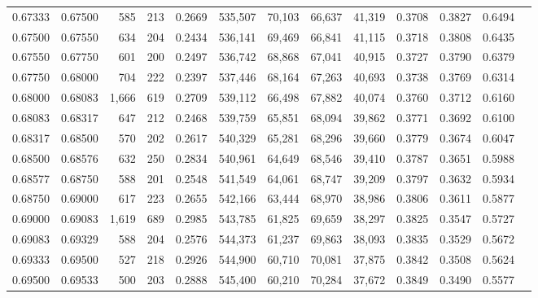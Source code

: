 \begin{tabular}{rrrrrrrrrrrrr}
0.67333 & 0.67500 &   585 & 213 &                                     0.2669 & 535,507 &  70,103 &  66,637 &  41,319 & 0.3708 & 0.3827 & 0.6494 \\
0.67500 & 0.67550 &   634 & 204 &                                     0.2434 & 536,141 &  69,469 &  66,841 &  41,115 & 0.3718 & 0.3808 & 0.6435 \\
0.67550 & 0.67750 &   601 & 200 &                                     0.2497 & 536,742 &  68,868 &  67,041 &  40,915 & 0.3727 & 0.3790 & 0.6379 \\
0.67750 & 0.68000 &   704 & 222 &                                     0.2397 & 537,446 &  68,164 &  67,263 &  40,693 & 0.3738 & 0.3769 & 0.6314 \\
0.68000 & 0.68083 & 1,666 & 619 &                                     0.2709 & 539,112 &  66,498 &  67,882 &  40,074 & 0.3760 & 0.3712 & 0.6160 \\
0.68083 & 0.68317 &   647 & 212 &                                     0.2468 & 539,759 &  65,851 &  68,094 &  39,862 & 0.3771 & 0.3692 & 0.6100 \\
0.68317 & 0.68500 &   570 & 202 &                                     0.2617 & 540,329 &  65,281 &  68,296 &  39,660 & 0.3779 & 0.3674 & 0.6047 \\
0.68500 & 0.68576 &   632 & 250 &                                     0.2834 & 540,961 &  64,649 &  68,546 &  39,410 & 0.3787 & 0.3651 & 0.5988 \\
0.68577 & 0.68750 &   588 & 201 &                                     0.2548 & 541,549 &  64,061 &  68,747 &  39,209 & 0.3797 & 0.3632 & 0.5934 \\
0.68750 & 0.69000 &   617 & 223 &                                     0.2655 & 542,166 &  63,444 &  68,970 &  38,986 & 0.3806 & 0.3611 & 0.5877 \\
0.69000 & 0.69083 & 1,619 & 689 &                                     0.2985 & 543,785 &  61,825 &  69,659 &  38,297 & 0.3825 & 0.3547 & 0.5727 \\
0.69083 & 0.69329 &   588 & 204 &                                     0.2576 & 544,373 &  61,237 &  69,863 &  38,093 & 0.3835 & 0.3529 & 0.5672 \\
0.69333 & 0.69500 &   527 & 218 &                                     0.2926 & 544,900 &  60,710 &  70,081 &  37,875 & 0.3842 & 0.3508 & 0.5624 \\
0.69500 & 0.69533 &   500 & 203 &                                     0.2888 & 545,400 &  60,210 &  70,284 &  37,672 & 0.3849 & 0.3490 & 0.5577 \\

\end{tabular}
